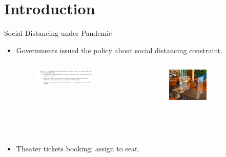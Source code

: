 
\section{Introduction}
\frame{\sectionpage}

\begin{frame}{Social Distancing under Pandemic}
  \begin{itemize}
    \item Governments issued the policy about social distancing constraint.
    \begin{columns}[c]  %
      \column{6cm}  %
      \begin{figure}[ht]
        \centering
        \includegraphics[width = 0.9\textwidth]{./images/res.jpg}
      \end{figure}
      \column{4cm}
      \scriptsize
      \begin{figure}[ht]
        \centering
        \includegraphics[width=0.8\textwidth,height=0.5\textwidth]{./images/res2.jpg}
      \end{figure}
      \end{columns} 
      \item Theater tickets booking: assign to seat.
      \begin{columns}[c]  %
        \column{6.5cm}  %

\end{columns}
\end{itemize}
\end{frame}
